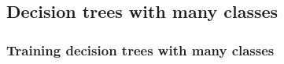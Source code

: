 
\subsection{Decision trees with many classes}

\subsubsection{Training decision trees with many classes}

